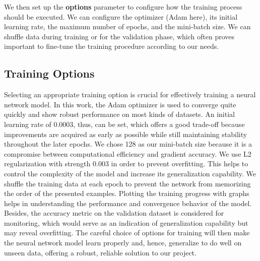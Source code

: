 \documentclass[a4paper]{report}
\begin{document}
{We then set up the \textbf{options} parameter to configure how the training process should be executed. We can configure the optimizer (Adam here), its initial learning rate, the maximum number of epochs, and the mini-batch size. We can shuffle data during training or for the validation phase, which often proves important to fine-tune the training procedure according to our needs.
\begin{center}
\end{center}
\subsection{Training Options}
Selecting an appropriate training option is crucial for effectively training a neural network model. In this work, the Adam optimizer is used to converge quite quickly and show robust performance on most kinds of datasets. An initial learning rate of 0.0003, thus, can be set, which offers a good trade-off because improvements are acquired as early as possible while still maintaining stability throughout the later epochs. We chose 128 as our mini-batch size because it is a compromise between computational efficiency and gradient accuracy. We use L2 regularization with strength 0.003 in order to prevent overfitting. This helps to control the complexity of the model and increase its generalization capability. We shuffle the training data at each epoch to prevent the network from memorizing the order of the presented examples. Plotting the training progress with graphs helps in understanding the performance and convergence behavior of the model. Besides, the accuracy metric on the validation dataset is considered for monitoring, which would serve as an indication of generalization capability but may reveal overfitting. The careful choice of options for training will then make the neural network model learn properly and, hence, generalize to do well on unseen data, offering a robust, reliable solution to our project.
\begin{center}
\end{center}
}
\end{document}
